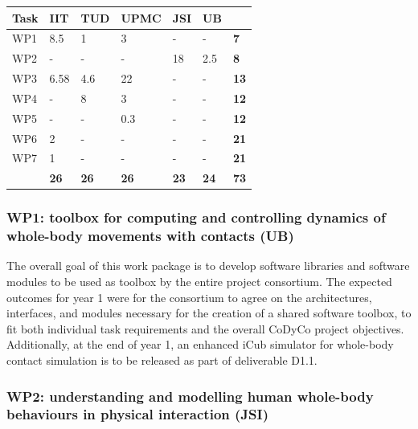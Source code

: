 \documentclass[12pt,a4paper,twoside]{article}
\begin{document}
\begin{longtable}{|C{1.5cm}|C{1.5cm}|C{1.5cm}|C{2cm}|C{2cm}|C{2cm}|C{2cm}|}
\footnotesize \textbf{Task}& \footnotesize \textbf{IIT}&\footnotesize \textbf{TUD}&\footnotesize \textbf{UPMC}& \footnotesize \textbf{JSI} &\footnotesize \textbf{UB} &  \\ \hline
\footnotesize WP1 &  8.5    &  1    &  3     & -   & -     & \textbf{7}  \\  \hline
\footnotesize WP2 &  -        &  -     &  -       & 18 & 2.5 & \textbf{8}\\ \hline
\footnotesize WP3 &  6.58 & 4.6  &  22    & -    & -     & \textbf{13}\\ \hline
\footnotesize WP4 & -         & 8     &  3      & -   & -     & \textbf{12}\\ \hline
\footnotesize WP5 & -         & -      &  0.3   & -    & -     & \textbf{12}\\ \hline
\footnotesize WP6 & 2        & -      &  -        & -    & -     & \textbf{21}\\ \hline
\footnotesize WP7 & 1        & -      &  -        & -    & -     & \textbf{21}\\ \hline
{}  & \textbf{26} & \textbf{26} & \textbf{26} & \textbf{23} & \textbf{24}  & \textbf{73} \\  
\end{longtable}

\subsubsection{WP1: toolbox for computing and controlling dynamics of whole-body movements with contacts (UB)}

The overall goal of this work package is to develop software libraries and software modules to be used as toolbox by the entire project consortium. The expected outcomes for year 1 were for the consortium to agree on the architectures, interfaces, and modules necessary for the creation of a shared software toolbox, to fit both individual task requirements and the overall CoDyCo project objectives.  Additionally, at the end of year 1, an enhanced iCub simulator for whole-body contact simulation is to be released as part of deliverable D1.1.

\subsubsection{WP2: understanding and modelling human whole-body behaviours in physical interaction (JSI)}
\end{document}

